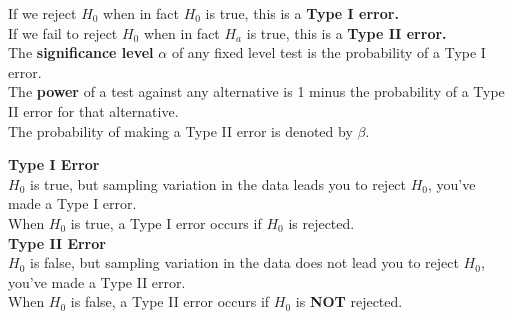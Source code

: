 If we reject $H_0$ when in fact $H_0$ is true, this is a \textbf{Type I error.} \\

If we fail to reject $H_0$ when in fact $H_a$ is true, this is a \textbf{Type II error.} \\

The \textbf{significance level} $\alpha$ of any fixed level test is the probability of a Type I error. \\

The \textbf{power} of a test against any alternative is 1 minus the probability of a Type II error for that alternative. \\

The probability of making a Type II error is denoted by $\beta$. 
\begin{tcolorbox}[title=\textbf{Decision Errors in Tests},
  colback=yellow!10,
  colframe=black!45,
  coltitle=black,
  fonttitle=\bfseries,
  breakable]

\textbf{Type I Error} \\
$H_0$ is true, but sampling variation in the data leads you to reject $H_0$, you’ve made a Type I error. \\
When $H_0$ is true, a Type I error occurs if $H_0$ is rejected. \\

\textbf{Type II Error} \\
$H_0$ is false, but sampling variation in the data does not lead you to reject $H_0$, you’ve made a Type II error. \\
When $H_0$ is false, a Type II error occurs if $H_0$ is \textbf{NOT} rejected.

\end{tcolorbox}

